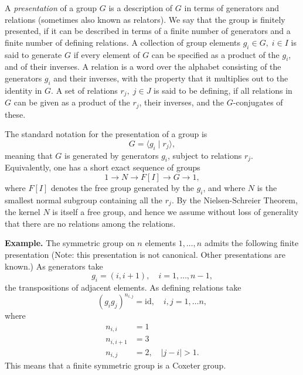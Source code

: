 \documentclass{article}
\begin{document}
A \emph{presentation} of a group $G$ is a description of $G$ in terms of
generators and relations (sometimes also known as relators).
We say that the group is finitely
presented, if it can be described in terms of a finite number of
generators and a finite number of defining relations. A collection of
group elements $g_i\in G,\;i\in I$ is said to generate $G$ if every
element of $G$ can be specified as a product of the $g_i$, and of their
inverses.  A relation is a word over the alphabet consisting of the
generators $g_i$ and their inverses, with the property that it
multiplies out to the identity in $G$.  A set of relations $r_j,\;
j\in J$ is said to be defining, if all relations in $G$ can be given
as a product of the $r_j$, their inverses, and the $G$-conjugates of
these.

The standard notation for the presentation of a group is
$$G= \langle g_i \mid r_j \rangle,$$
meaning that $G$ is generated by generators $g_i$, subject to
relations $r_j$.  Equivalently, one has a short exact sequence of
groups 
$$1 \to N \to F[I] \to G\to 1,$$
where $F[I]$ denotes the free group
generated by the $g_i$, and where $N$ is the smallest normal subgroup
containing all the $r_j$. By the Nielsen-Schreier Theorem, the kernel $N$
is itself a free group, and hence we assume without loss of generality
that there are no relations among the relations. 

{\bf Example.}  The symmetric group on $n$ elements $1,\ldots, n$
admits the following finite presentation (Note: this presentation is
not canonical.  Other presentations are known.)  As generators take
$$g_i=(i, i+1),\quad i=1,\ldots, n-1,$$
the transpositions of adjacent elements. As defining relations take
$$(g_i g_j)^{n_{i,j}} = \mathrm{id},\quad i,j=1,\ldots n,$$
where
\begin{align*}
  n_{i,i} &= 1 \\
  n_{i,i+1} &= 3 \\
  n_{i,j} &=2,\quad \vert j-i \vert > 1.
\end{align*}
This means that a finite symmetric group is a Coxeter group.
\end{document}
